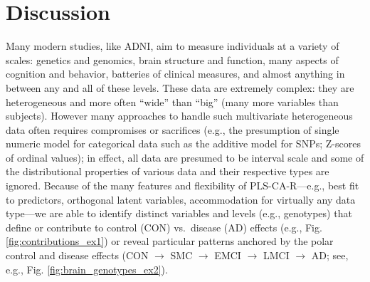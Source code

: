 \documentclass[12pt]{article}
\begin{document}
\hypertarget{discussion}{%
\section{Discussion}\label{discussion}}

\label{section:Disc}

Many modern studies, like ADNI, aim to measure individuals at a variety
of scales: genetics and genomics, brain structure and function, many
aspects of cognition and behavior, batteries of clinical measures, and
almost anything in between any and all of these levels. These data are
extremely complex: they are heterogeneous and more often ``wide'' than
``big'' (many more variables than subjects). However many approaches to
handle such multivariate heterogeneous data often requires compromises
or sacrifices (e.g., the presumption of single numeric model for
categorical data such as the additive model for SNPs; Z-scores of
ordinal values); in effect, all data are presumed to be interval scale
and some of the distributional properties of various data and their
respective types are ignored. Because of the many features and
flexibility of PLS-CA-R---e.g., best fit to predictors, orthogonal
latent variables, accommodation for virtually any data type---we are
able to identify distinct variables and levels (e.g., genotypes) that
define or contribute to control (CON) vs.~disease (AD) effects (e.g.,
Fig. \ref{fig:contributions_ex1}) or reveal particular patterns anchored
by the polar control and disease effects (CON \(\rightarrow\) SMC
\(\rightarrow\) EMCI \(\rightarrow\) LMCI \(\rightarrow\) AD; see, e.g.,
Fig. \ref{fig:brain_genotypes_ex2}).
\end{document}

